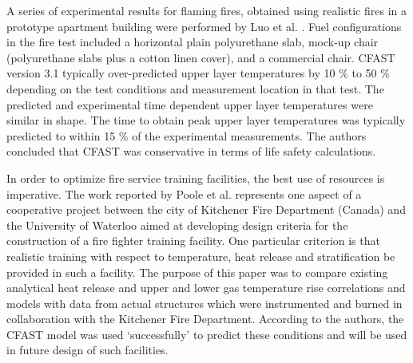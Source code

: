 A series of experimental results for flaming fires, obtained using realistic fires in a prototype apartment building were performed by Luo et al. \cite{Valid:Luo}. Fuel configurations in the fire test included a horizontal plain polyurethane slab, mock-up chair (polyurethane slabs plus a cotton linen cover), and a commercial chair. CFAST version 3.1 typically over-predicted upper layer temperatures by 10 \% to 50 \% depending on the test conditions and measurement location in that test. The predicted and experimental time dependent upper layer temperatures were similar in shape. The time to obtain peak upper layer temperatures was typically predicted to within 15 \% of the experimental measurements. The authors concluded that CFAST was conservative in terms of life safety calculations.

In order to optimize fire service training facilities, the best use of resources is imperative. The work reported by Poole et al. \cite{Valid:Poole} represents one aspect of a cooperative project between the city of Kitchener Fire Department (Canada) and the University of Waterloo aimed at developing design criteria for the construction of a fire fighter training facility. One particular criterion is that realistic training with respect to temperature, heat release and stratification be provided in such a facility. The purpose of this paper was to compare existing analytical heat release and upper and lower gas temperature rise correlations and models with data from actual structures which were instrumented and burned in collaboration with the Kitchener Fire Department. According to the authors, the CFAST model was used `successfully' to predict these conditions and will be used in future design of such facilities.

